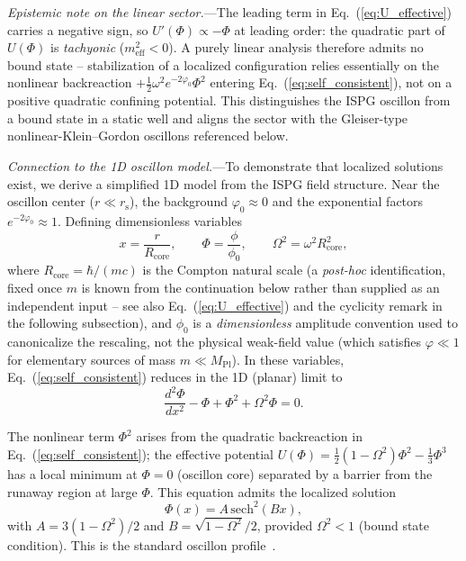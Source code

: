 \documentclass[aps,prd,onecolumn,superscriptaddress,nofootinbib,showpacs,12pt,notitlepage]{revtex4-2}
\newcommand{\rs}{r_{\mathrm{s}}}
\begin{document}
\textit{Epistemic note on the linear sector.}---The leading
term in Eq.~(\ref{eq:U_effective}) carries a negative sign,
so $U'(\Phi)\propto -\Phi$ at leading order: the quadratic
part of $U(\Phi)$ is \emph{tachyonic} ($m_{\mathrm{eff}}^2<0$).
A purely linear analysis therefore admits no bound state --
stabilization of a localized configuration relies essentially
on the nonlinear backreaction $+\tfrac{1}{2}\omega^2
e^{-2\varphi_0}\Phi^2$ entering
Eq.~(\ref{eq:self_consistent}), not on a positive quadratic
confining potential.  This distinguishes the ISPG oscillon
from a bound state in a static well and aligns the sector
with the Gleiser-type nonlinear-Klein--Gordon oscillons
referenced below.

\textit{Connection to the 1D oscillon model.}---To demonstrate
that localized solutions exist, we derive a simplified 1D model
from the ISPG field structure.  Near the oscillon center
($r \ll \rs$), the background $\varphi_0 \approx 0$ and the
exponential factors $e^{-2\varphi_0} \approx 1$.  Defining
dimensionless variables
\begin{equation}
  x = \frac{r}{R_{\mathrm{core}}}, \qquad
  \Phi = \frac{\phi}{\phi_0}, \qquad
  \Omega^2 = \omega^2 R_{\mathrm{core}}^2,
\end{equation}
where $R_{\mathrm{core}} = \hbar/(mc)$ is the Compton natural
scale (a \emph{post-hoc} identification, fixed once $m$ is
known from the continuation below rather than supplied as an
independent input -- see also Eq.~(\ref{eq:U_effective}) and
the cyclicity remark in the following subsection), and
$\phi_0$ is a \emph{dimensionless} amplitude convention used
to canonicalize the rescaling, not the physical weak-field
value (which satisfies $\varphi\ll 1$ for elementary sources
of mass $m\ll M_{\mathrm{Pl}}$).  In these variables,
Eq.~(\ref{eq:self_consistent}) reduces in the 1D (planar)
limit to
\begin{equation}\label{eq:1d_oscillon}
  \frac{d^2\Phi}{dx^2} - \Phi + \Phi^2 + \Omega^2\Phi = 0.
\end{equation}

The nonlinear term $\Phi^2$ arises from the quadratic backreaction
in Eq.~(\ref{eq:self_consistent}); the effective potential
$U(\Phi) = \frac{1}{2}(1-\Omega^2)\Phi^2 - \frac{1}{3}\Phi^3$
has a local minimum at $\Phi = 0$ (oscillon core) separated by
a barrier from the runaway region at large $\Phi$.  This
equation admits the localized solution
\begin{equation}
  \Phi(x) = A\,\mathrm{sech}^2(Bx),
\end{equation}
with $A = 3(1-\Omega^2)/2$ and $B = \sqrt{1-\Omega^2}/2$,
provided $\Omega^2 < 1$ (bound state condition).  This is
the standard oscillon profile~\cite{Bogolyubsky1976,Gleiser1994,Copeland1995}.
\end{document}
